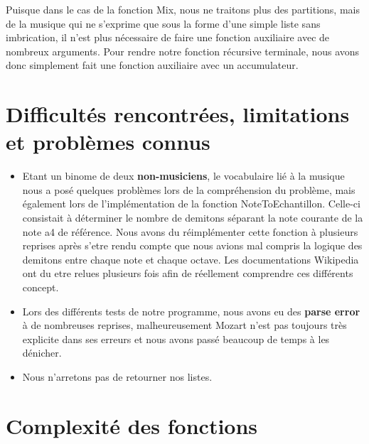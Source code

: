\documentclass[a4paper,12pt]{report}
\begin{document}
Puisque dans le cas de la fonction Mix, nous ne traitons plus des partitions, mais de la musique qui ne s'exprime que sous la forme d'une simple liste sans imbrication, il n'est plus nécessaire de faire une fonction auxiliaire avec de nombreux arguments. Pour rendre notre fonction récursive terminale, nous avons donc simplement fait une fonction auxiliaire avec un accumulateur. 


\section*{Difficultés rencontrées, limitations et problèmes connus}
\begin{itemize}
\item Etant un binome de deux \textbf{non-musiciens}, le vocabulaire lié à la musique nous a posé quelques problèmes lors de la compréhension du problème, mais également lors de l'implémentation de la fonction NoteToEchantillon. Celle-ci consistait à déterminer le nombre de demitons séparant la note courante de la note a4 de référence. Nous avons du réimplémenter cette fonction à plusieurs reprises après s'etre rendu compte que nous avions mal compris la logique des demitons entre chaque note et chaque octave. Les documentations Wikipedia ont du etre relues plusieurs fois afin de réellement comprendre ces différents concept.

\item Lors des différents tests de notre programme, nous avons eu des \textbf{parse error} à de nombreuses reprises, malheureusement Mozart n'est pas toujours très explicite dans ses erreurs et nous avons passé beaucoup de temps à les dénicher. 
 
\item Nous n'arretons pas de retourner nos listes.
\end{itemize}


\section*{Complexité des fonctions}
\end{document}
